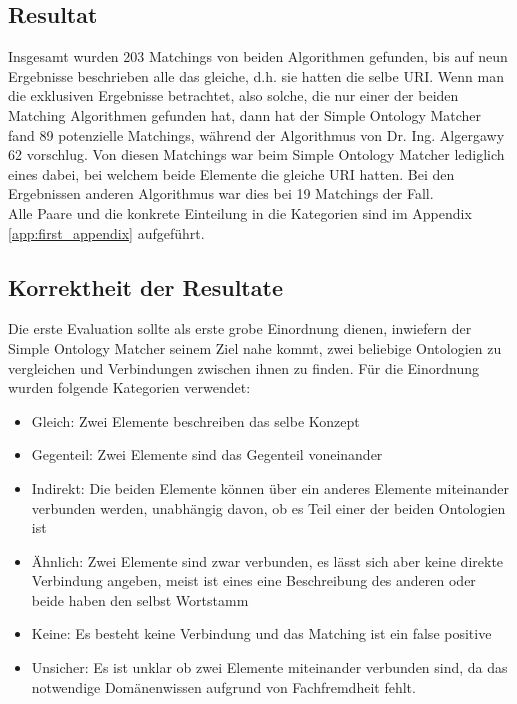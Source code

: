 		\subsection{Resultat}
		Insgesamt wurden 203 Matchings von beiden Algorithmen gefunden, bis auf neun
		Ergebnisse beschrieben alle das gleiche, d.h. sie hatten die selbe URI.
		Wenn man die exklusiven Ergebnisse betrachtet, also solche, die nur einer
		der beiden Matching Algorithmen gefunden hat, dann hat der Simple Ontology
		Matcher fand 89 potenzielle Matchings, während der Algorithmus von Dr. Ing.
		Algergawy 62 vorschlug. Von diesen Matchings war beim Simple Ontology Matcher
		lediglich eines dabei, bei welchem beide Elemente die gleiche URI hatten. Bei
		den Ergebnissen anderen Algorithmus war dies bei 19 Matchings der Fall.\\
		Alle Paare und die konkrete Einteilung in die Kategorien sind im Appendix
		\ref{app:first_appendix}
		aufgeführt.
		
		\subsection{Korrektheit der Resultate}
		Die erste Evaluation sollte als erste grobe Einordnung dienen, inwiefern
		der Simple Ontology Matcher seinem Ziel nahe kommt, zwei beliebige Ontologien
		zu vergleichen und Verbindungen zwischen ihnen zu finden. Für die Einordnung
		wurden folgende Kategorien verwendet:\\
		\begin{itemize}
		  \item Gleich: Zwei Elemente beschreiben das selbe Konzept
		  \item Gegenteil: Zwei Elemente sind das Gegenteil voneinander
		  \item Indirekt: Die beiden Elemente können über ein anderes Elemente
		  miteinander verbunden werden, unabhängig davon, ob es Teil einer der beiden
		  Ontologien ist
		  \item Ähnlich: Zwei Elemente sind zwar verbunden, es lässt sich aber keine
		  direkte Verbindung angeben, meist ist eines eine Beschreibung des anderen
		  oder beide haben den selbst Wortstamm
		  \item Keine: Es besteht keine Verbindung und das Matching ist ein false
		  positive
		  \item Unsicher: Es ist unklar ob zwei Elemente miteinander verbunden sind,
		  da das notwendige Domänenwissen aufgrund von Fachfremdheit fehlt.
		\end{itemize}
		
